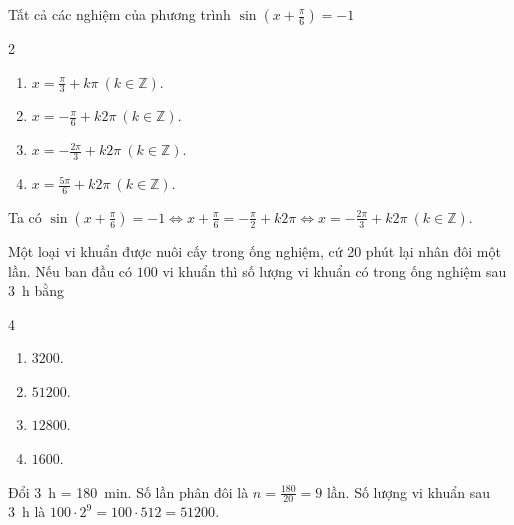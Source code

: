 \begin{baitap}
	Tất cả các nghiệm của phương trình $\sin \left(x + \frac{\pi}{6}\right) = -1$
	\begin{multicols}{2}
		\begin{enumerate}
			\item $x = \frac{\pi}{3} + k\pi \ (k \in \mathbb{Z})$.
			\item $x = -\frac{\pi}{6} + k2\pi \ (k \in \mathbb{Z})$.
			\item $x = -\frac{2\pi}{3} + k2\pi \ (k \in \mathbb{Z})$.
			\item $x = \frac{5\pi}{6} + k2\pi \ (k \in \mathbb{Z})$.
		\end{enumerate}
	\end{multicols}
	\begin{traloi}
		Ta có $\sin \left(x + \frac{\pi}{6}\right) = -1 \Leftrightarrow x + \frac{\pi}{6} = -\frac{\pi}{2} + k2\pi \Leftrightarrow x = -\frac{2\pi}{3} + k2\pi \ (k \in \mathbb{Z})$.
	\end{traloi}
\end{baitap}

\begin{baitap}
	Một loại vi khuẩn được nuôi cấy trong ống nghiệm, cứ {20} phút lại nhân đôi một lần. Nếu ban đầu có $100$ vi khuẩn thì số lượng vi khuẩn có trong ống nghiệm sau \qty{3}{\hour} bằng
	\begin{multicols}{4}
		\begin{enumerate}
			\item $3200$.
			\item $51200$.
			\item $12800$.
			\item $1600$.
		\end{enumerate}
	\end{multicols}
	\begin{traloi}
		\dapan{B}
		Đổi \qty{3}{\hour} = \qty{180}{\minute}.
		Số lần phân đôi là $n = \frac{180}{20} = 9$ lần.
		Số lượng vi khuẩn sau \qty{3}{\hour} là $100 \cdot 2^9 = 100 \cdot 512 = 51200$.
	\end{traloi}
\end{baitap}

